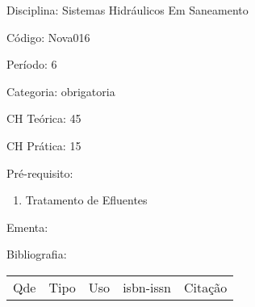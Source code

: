 \documentclass[12pt,a4paper,twoside]{report}
\begin{document}
Disciplina: Sistemas Hidráulicos Em Saneamento

Código: Nova016

Período: 6

Categoria: obrigatoria

CH Teórica: 45

CH Prática: 15




Pré-requisito:
\begin{enumerate}
\item Tratamento de Efluentes
\end{enumerate}

Ementa:
\begin{enumerate}
\end{enumerate}



Bibliografia:


\begin{tabular}{llllp{8cm}}
Qde & Tipo & Uso & isbn-issn & Citação \\
\end{tabular}
\end{document}

